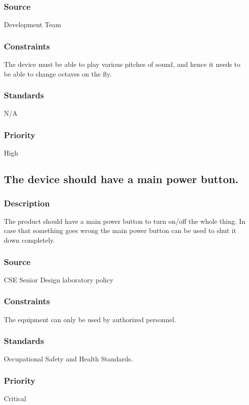 \subsubsection{Source}
Development Team
\subsubsection{Constraints}
The device must be able to play various pitches of sound, and hence it needs to be able to change octaves on the fly. 
\subsubsection{Standards}
N/A
\subsubsection{Priority}
High

\subsection{The device should have a main power button.}
\subsubsection{Description}
The product should have a main power button to turn on/off the whole thing. In case that something goes wrong the main power button can be used to shut it down completely.
\subsubsection{Source}
CSE Senior Design laboratory policy
\subsubsection{Constraints}
The equipment can only be used by authorized personnel.
\subsubsection{Standards}
Occupational Safety and Health Standards.
\subsubsection{Priority}
Critical
